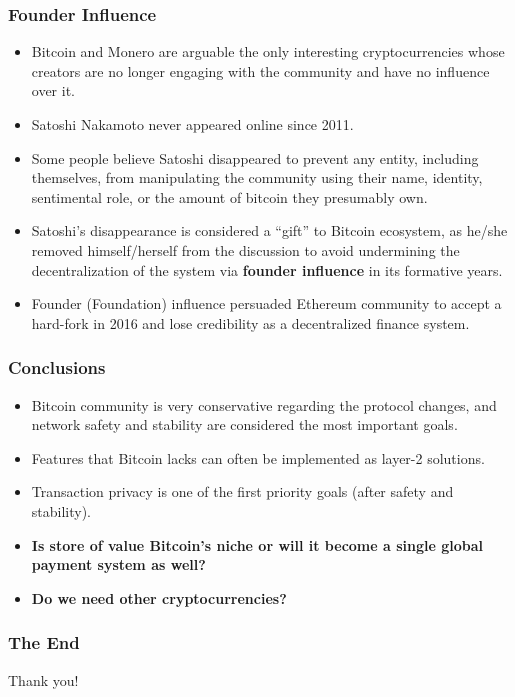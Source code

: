 \documentclass{beamer}
\begin{document}
\begin{frame}
  \frametitle{Founder Influence}
  \begin{itemize}
  \item Bitcoin and Monero are arguable the only interesting cryptocurrencies
    whose creators are no longer engaging with the community and have no
    influence over it.
  \item Satoshi Nakamoto never appeared online since 2011.
  \item Some people believe Satoshi disappeared to prevent any entity, including
    themselves, from manipulating the community using their name, identity,
    sentimental role, or the amount of bitcoin they presumably own.
  \item Satoshi's disappearance is considered a ``gift'' to Bitcoin ecosystem,
    as he/she removed himself/herself from the discussion to avoid undermining
    the decentralization of the system via \textbf{founder influence} in its
    formative years.
  \item Founder (Foundation) influence persuaded Ethereum community to accept a
    hard-fork in 2016 and lose credibility as a decentralized finance system.
  \end{itemize}
\end{frame}


\begin{frame}
  \frametitle{Conclusions}
  \begin{itemize}
  \item Bitcoin community is very conservative regarding the protocol changes,
    and network safety and stability are considered the most important goals.
  \item Features that Bitcoin lacks can often be implemented as layer-2
    solutions.
  \item Transaction privacy is one of the first priority goals (after safety and
    stability).
  \item \textbf{Is store of value Bitcoin's niche or will it become a single
      global payment system as well?}
  \item \textbf{Do we need other cryptocurrencies?}
  \end{itemize}
\end{frame}

\begin{frame}
  \frametitle{The End}
  \begin{center}
    Thank you!
  \end{center}
\end{frame}
\end{document}
